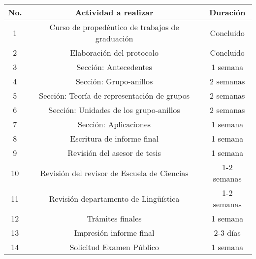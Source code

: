 \documentclass[12pt,letterpaper,titlepage]{article}
\begin{document}
\vspace{1cm}

\begin{tabular}{|c|c|c|}
  \hline
   \textbf{No.}  &  \textbf{Actividad a realizar} &  \textbf{Duración }\\ \hline
  1  & Curso de propedéutico de trabajos de graduación & Concluido \\
  2  & Elaboración del protocolo & Concluido \\
  3  & Sección: Antecedentes & 1 semana \\
  4  & Sección: Grupo-anillos & 2 semanas \\
  5  & Sección: Teoría de representación de grupos & 2 semanas \\
  6  & Sección: Unidades de los grupo-anillos & 2 semanas \\
  7  & Sección: Aplicaciones & 1 semana \\
  8  & Escritura de informe final & 1 semana \\
  9  & Revisión del asesor de tesis & 1 semana \\
  10 & Revisión del revisor de Escuela de Ciencias & 1-2 semanas \\
  11 & Revisión departamento de Lingüística & 1-2 semanas \\
  12 & Trámites finales & 1 semana  \\
  13 & Impresión informe final & 2-3 días \\
  14 & Solicitud Examen Público & 1 semana \\
  \hline
\end{tabular}

\newpage
\end{document}

